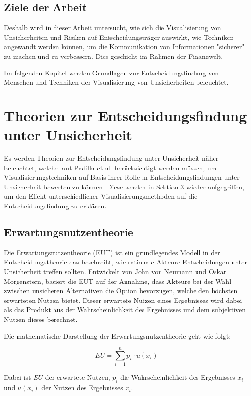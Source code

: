 \subsection{Ziele der Arbeit}
Deshalb wird in dieser Arbeit untersucht, wie sich die Visualisierung von Unsicherheiten und Risiken auf Entscheidungsträger auswirkt, 
wie Techniken angewandt werden können, um die Kommunikation von Informationen "sicherer" zu machen und zu verbessern. Dies geschieht im Rahmen der Finanzwelt.

Im folgenden Kapitel werden Grundlagen zur Entscheidungsfindung von Menschen und Techniken der Visualisierung von Unsicherheiten beleuchtet.


\section{Theorien zur Entscheidungsfindung unter Unsicherheit}
Es werden Theorien zur Entscheidungsfindung unter Unsicherheit näher beleuchtet, welche laut Padilla et al. \cite{VisualizationPsychology2023}  berücksichtigt werden müssen, um Visualisierungstechniken auf Basis ihrer Rolle in Entscheidungsfindungen unter Unsicherheit bewerten zu können. Diese werden in Sektion 3 wieder aufgegriffen, um den Effekt unterschiedlicher Visualisierungsmethoden auf die Entscheidungsfindung zu erklären.

\subsection{Erwartungsnutzentheorie}

Die Erwartungsnutzentheorie (EUT) ist ein grundlegendes Modell in der Entscheidungstheorie das beschreibt, wie rationale Akteure Entscheidungen unter Unsicherheit treffen sollten. Entwickelt von John von Neumann und Oskar Morgenstern, basiert die EUT auf der Annahme, dass Akteure bei der Wahl zwischen unsicheren Alternativen die Option bevorzugen, welche den höchsten erwarteten Nutzen bietet. Dieser erwartete Nutzen eines Ergebnisses wird dabei als das Produkt aus der Wahrscheinlichkeit des Ergebnisses und dem subjektiven Nutzen dieses berechnet.

Die mathematische Darstellung der Erwartungsnutzentheorie geht wie folgt:

\begin{equation}
EU = \sum_{i=1}^{n} p_i \cdot u(x_i)
\end{equation}

Dabei ist \( EU \) der erwartete Nutzen, \( p_i \) die Wahrscheinlichkeit des Ergebnisses \( x_i \) und \( u(x_i) \) der Nutzen des Ergebnisses \( x_i \).

